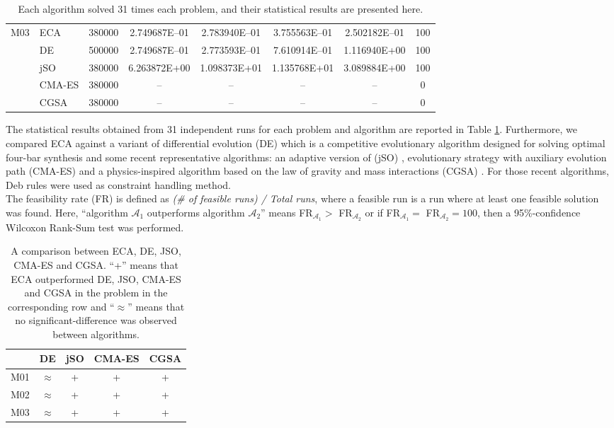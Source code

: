 \documentclass[12pt,letterpape]{article}
\begin{document}
\begin{table}[!ht]
\begin{tabular}{clrccccc}
		\multirow{5}{*}{M03}
		& ECA & 380000  & 2.749687E--01 & 2.783940E--01 & 3.755563E--01 & 2.502182E--01 & 100\\ 
		& DE  & 500000  & 2.749687E--01 & 2.773593E--01 & 7.610914E--01 & 1.116940E+00  & 100\\
        & jSO & 380000  & 6.263872E+00  & 1.098373E+01  & 1.135768E+01  & 3.089884E+00  & 100 \\
        & CMA-ES&380000 &      --       &      --       &       --      &       --      & 0 \\
        & CGSA& 380000  &      --       &      --       &       --      &       --      & 0 \\ \hline
	\end{tabular}
	\caption{Each algorithm solved 31 times each problem, and their statistical results
	are presented here.}
	\label{eqn:statRes}
\end{table}
% 
The statistical results obtained from 31 independent runs for each problem and
algorithm are reported in Table \ref{eqn:statRes}. Furthermore, we compared ECA
against a variant of differential
evolution (DE) \cite{ed1995} which is a competitive evolutionary algorithm designed
for solving optimal four-bar synthesis \cite{hernandez2016} and some recent
representative algorithms: an adaptive version of (jSO) \cite{jso2017}, evolutionary
strategy with auxiliary evolution path (CMA-ES) \cite{li2017efficient} and a
physics-inspired algorithm based on the law of gravity and mass interactions
(CGSA) \cite{mirjalili2017chaotic}. For those recent algorithms, Deb rules were
used as constraint handling method.\\

The feasibility rate (FR) is defined as \textit{(\# of feasible runs) / Total runs},
where a feasible run is a run where at least one feasible solution was found. Here,
``algorithm $\mathcal{A}_1$ outperforms algorithm $\mathcal{A}_2$'' means 
FR$_{\mathcal{A}_1} > $ FR$_{\mathcal{A}_2}$ or if FR$_{\mathcal{A}_1} = $ FR$_{\mathcal{A}_2} = 100$,
then a 95\%-confidence Wilcoxon Rank-Sum test was performed.

%
\begin{table}[!ht]
	\centering
	\begin{tabular}{ccccc}
	        &     DE    & jSO & CMA-ES & CGSA \\ \hline
		M01 & $\approx$ &  +  &  + &  +    \\
		M02 & $\approx$ &  +  &  + &  +    \\
		M03 & $\approx$ &  +  &  + &  +    \\
	\end{tabular}
	\caption{ A comparison between ECA, DE, JSO, CMA-ES and CGSA. ``+'' means that
			  ECA outperformed DE, JSO, CMA-ES and CGSA in the problem  %
			  in the corresponding row and ``$\approx$'' means that no significant-difference
			  was observed between algorithms.}
	\label{tab:summary1}
\end{table}
%
\end{document}
